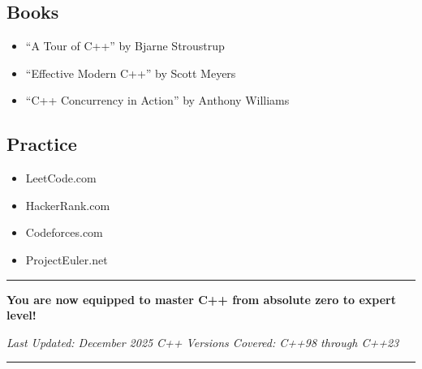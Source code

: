 \hypertarget{books}{%
\subsection{Books}\label{books}}

\begin{itemize}
\tightlist
\item
  ``A Tour of C++'' by Bjarne Stroustrup
\item
  ``Effective Modern C++'' by Scott Meyers
\item
  ``C++ Concurrency in Action'' by Anthony Williams
\end{itemize}

\hypertarget{practice}{%
\subsection{Practice}\label{practice}}

\begin{itemize}
\tightlist
\item
  LeetCode.com
\item
  HackerRank.com
\item
  Codeforces.com
\item
  ProjectEuler.net
\end{itemize}

\begin{center}\rule{0.5\linewidth}{0.5pt}\end{center}

\textbf{You are now equipped to master C++ from absolute zero to expert
level!}

\emph{Last Updated: December 2025} \emph{C++ Versions Covered: C++98
through C++23}

\begin{center}\rule{0.5\linewidth}{0.5pt}\end{center}
